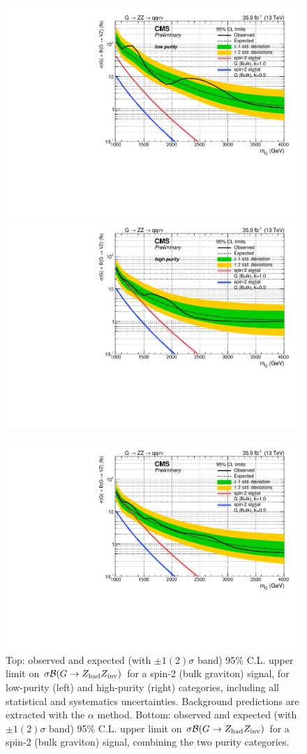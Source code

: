 \begin{figure}[!htb]
  \begin{center}
     \includegraphics[width=.495\textwidth]{v9/plotsAlpha/Limits/Exclusion_XZZInv_XVZnnlp1p0_asymptotic.pdf}%
     \includegraphics[width=.495\textwidth]{v9/plotsAlpha/Limits/Exclusion_XZZInv_XVZnnhp1p0_asymptotic.pdf}

     \includegraphics[width=.495\textwidth]{v9/plotsAlpha/Limits/Exclusion_XZZInv_XVZnn1p0_asymptotic.pdf}
  \end{center}
  \caption{Top: observed and expected (with $\pm1(2)\sigma$ band) 95\% C.L. upper limit on $\sigma \mathcal{B} (G \rightarrow Z_{\text{had}} Z_{\text{inv}})$ for a spin-2 (bulk graviton) signal, for low-purity (left) and high-purity (right) categories, including all statistical and systematics uncertainties. Background predictions are extracted with the $\alpha$ method. Bottom: observed and expected (with $\pm1(2)\sigma$ band) 95\% C.L. upper limit on $\sigma \mathcal{B} (G \rightarrow Z_{\text{had}} Z_{\text{inv}})$ for a spin-2 (bulk graviton) signal, combining the two purity categories.}
  \label{fig:Limit_XZZInv}
\end{figure}

